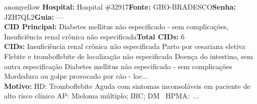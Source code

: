 \documentclass[a4paper,10pt]{article}
\begin{document}
\begin{anomalycard}[Interna\c{c}\~{a}o \#118062 | Pac. \#36595 | MODERADO (z=2.34) | LOS: 30d | 21/02/2026\,$\to$\,—]{anomyellow}
\textbf{Hospital:} Hospital \#32917\quad \textbf{Fonte:} GHO-BRADESCO\quad \textbf{Senha:} JZH7QL2\quad \textbf{Guia:} ---\\

\textbf{CID Principal:} {\small Diabetes mellitus não especificado - sem complicações, Insuficiência renal crônica não especificada}\quad\textbf{Total CIDs:} 6\\

\textbf{CIDs:} {\scriptsize Insuficiência renal crônica não especificada \textbar{} Parto por cesariana eletiva \textbar{} Flebite e tromboflebite de localização não especificada \textbar{} Doença do intestino, sem outra especificação \textbar{} Diabetes mellitus não especificado - sem complicações \textbar{} Mordedura ou golpe provocado por cão - loc...}\\

\textbf{Motivo:} {\scriptsize HD: Tromboflebite Aguda com sintomas inconsoláveis em paciente de alto risco clínico   AP: Mieloma múltiplo; IRC; DM    HPMA: ...}\\




\end{anomalycard}
\end{document}
